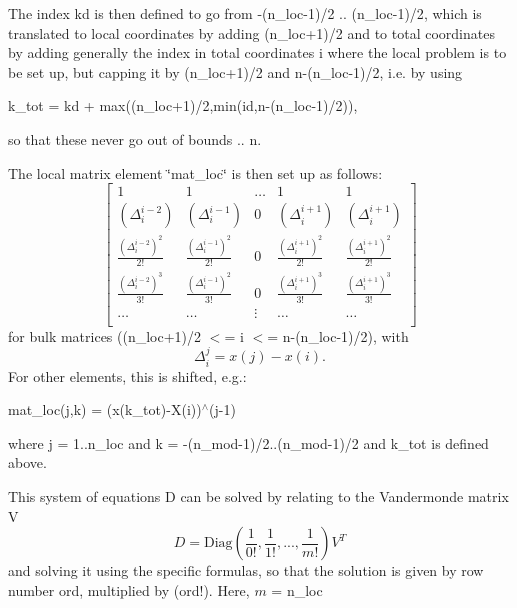 The index {\ttfamily kd} is then defined to go from {\ttfamily -\/(n\+\_\+loc-\/1)/2 .. (n\+\_\+loc-\/1)/2}, which is translated to local coordinates by adding {\ttfamily (n\+\_\+loc+1)/2} and to total coordinates by adding generally the index in total coordinates {\ttfamily i} where the local problem is to be set up, but capping it by {\ttfamily (n\+\_\+loc+1)/2} and {\ttfamily n-\/(n\+\_\+loc-\/1)/2}, i.\+e. by using

{\ttfamily k\+\_\+tot = kd + max((n\+\_\+loc+1)/2,min(id,n-\/(n\+\_\+loc-\/1)/2))},

so that these never go out of bounds { .. n}.

The local matrix element \char`\"{}mat\+\_\+loc\char`\"{} is then set up as follows\+: \[ \left[\begin{array}{ccccc} 1 & 1 & \ldots & 1 & 1 \\ \left(\Delta^{i-2}_i\right) & \left(\Delta^{i-1}_i\right) & 0 & \left(\Delta^{i+1}_i\right) & \left(\Delta^{i+1}_i\right) \\ \frac{\left(\Delta^{i-2}_i\right)^2}{2!} & \frac{\left(\Delta^{i-1}_i\right)^2}{2!} & 0 & \frac{\left(\Delta^{i+1}_i\right)^2}{2!} & \frac{\left(\Delta^{i+1}_i\right)^2}{2!} \\ \frac{\left(\Delta^{i-2}_i\right)^3}{3!} & \frac{\left(\Delta^{i-1}_i\right)^2}{3!} & 0 & \frac{\left(\Delta^{i+1}_i\right)^3}{3!} & \frac{\left(\Delta^{i+1}_i\right)^3}{3!} \\ \ldots & \ldots & \vdots & \ldots & \ldots \\ \end{array}\right]\] for bulk matrices {\ttfamily ((n\+\_\+loc+1)/2 $<$= i $<$= n-\/(n\+\_\+loc-\/1)/2)}, with \[\Delta^j_i = x\left(j\right)-x\left(i\right). \] For other elements, this is shifted, e.\+g.\+:

{\ttfamily mat\+\_\+loc(j,k) = (x(k\+\_\+tot)-\/X(i))$^\wedge$(j-\/1) }

where {\ttfamily j = 1..n\+\_\+loc} and {\ttfamily k = -\/(n\+\_\+mod-\/1)/2..(n\+\_\+mod-\/1)/2} and {\ttfamily k\+\_\+tot} is defined above.

This system of equations {\ttfamily D} can be solved by relating to the Vandermonde matrix {\ttfamily V} \[ D = \text{Diag}\left(\frac{1}{0!},\frac{1}{1!},...,\frac{1}{m!}\right) V^T \] and solving it using the specific formula\textquotesingle{}s, so that the solution is given by row number {\ttfamily ord}, multiplied by {\ttfamily (ord!)}. Here, $m$ = {\ttfamily n\+\_\+loc} 

